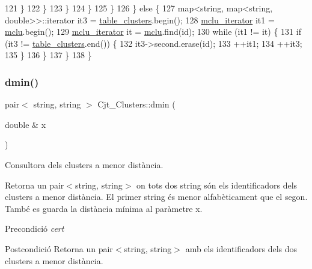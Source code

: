\begin{DoxyCode}
121                     \}                     
122                 \}
123             \}
124         \}
125     \}
126     \} \textcolor{keywordflow}{else} \{
127         map<string, map<string, double>>::iterator it3 = \hyperlink{class_cjt___clusters_a6af3fcf70683cdb88f137f6f51002939}{table\_clusters}.begin();
128         \hyperlink{class_cjt___clusters_ad9cf46a8e1e6430c7b34b184f2756054}{mclu\_iterator} it1 = \hyperlink{class_cjt___clusters_a5f5e13255bca1fac2ad65c51473f6ead}{mclu}.begin();
129         \hyperlink{class_cjt___clusters_ad9cf46a8e1e6430c7b34b184f2756054}{mclu\_iterator} it = \hyperlink{class_cjt___clusters_a5f5e13255bca1fac2ad65c51473f6ead}{mclu}.find(\textcolor{keywordtype}{id});
130         \textcolor{keywordflow}{while} (it1 != it) \{
131             \textcolor{keywordflow}{if} (it3 != \hyperlink{class_cjt___clusters_a6af3fcf70683cdb88f137f6f51002939}{table\_clusters}.end()) \{
132                 it3->second.erase(\textcolor{keywordtype}{id});
133                 ++it1;
134                 ++it3;
135             \}
136         \}
137     \}
138 \}
\end{DoxyCode}
\mbox{\label{class_cjt___clusters_a3db57ec9903b4f5439679ac9ba41fab1}} 
\subsubsection{\texorpdfstring{dmin()}{dmin()}}
{\footnotesize\ttfamily pair$<$ string, string $>$ Cjt\+\_\+\+Clusters\+::dmin (\begin{DoxyParamCaption}\item[{double \&}]{x }\end{DoxyParamCaption})}



Consultora dels clusters a menor distància. 

Retorna un pair$<$string, string$>$ on tots dos string són els identificadors dels clusters a menor distància. El primer string és menor alfabèticament que el segon. També es guarda la distància mínima al paràmetre x.

\begin{DoxyPrecond}{Precondició}
{\itshape cert} 
\end{DoxyPrecond}
\begin{DoxyPostcond}{Postcondició}
Retorna un pair$<$string, string$>$ amb els identificadors dels dos clusters a menor distància. 
\end{DoxyPostcond}


